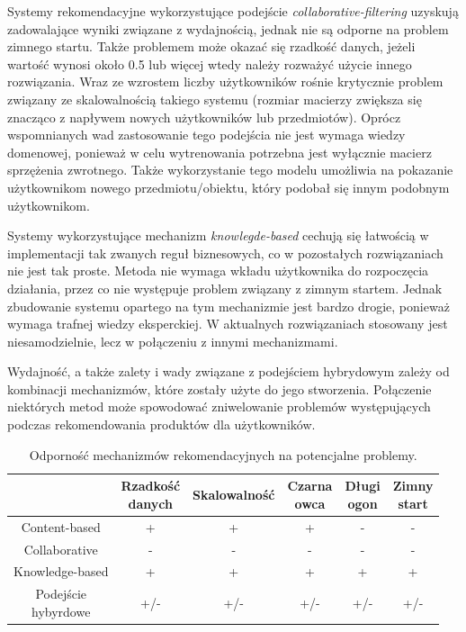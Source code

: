 Systemy rekomendacyjne wykorzystujące podejście \textit{collaborative-filtering} uzyskują zadowalające wyniki związane z wydajnością, jednak nie są odporne na problem zimnego startu. Także problemem może okazać się rzadkość danych, jeżeli wartość wynosi około 0.5 lub więcej wtedy należy rozważyć użycie innego rozwiązania. Wraz ze wzrostem liczby użytkowników rośnie krytycznie problem związany ze skalowalnością takiego systemu (rozmiar macierzy zwiększa się znacząco z napływem nowych użytkowników lub przedmiotów). Oprócz wspomnianych wad zastosowanie tego podejścia nie jest wymaga wiedzy domenowej, ponieważ w celu wytrenowania potrzebna jest wyłącznie macierz sprzężenia zwrotnego. Także wykorzystanie tego modelu umożliwia na pokazanie użytkownikom nowego przedmiotu/obiektu, który podobał się innym podobnym użytkownikom.

Systemy wykorzystujące mechanizm \textit{knowlegde-based} cechują się łatwością w implementacji tak zwanych reguł biznesowych, co w pozostałych rozwiązaniach nie jest tak proste. Metoda nie wymaga wkładu użytkownika do rozpoczęcia działania, przez co nie występuje problem związany z zimnym startem. Jednak zbudowanie systemu opartego na tym mechanizmie jest bardzo drogie, ponieważ wymaga trafnej wiedzy eksperckiej. W aktualnych rozwiązaniach stosowany jest niesamodzielnie, lecz w połączeniu z innymi mechanizmami.  \cite{reviewCurrentRS}

Wydajność, a także zalety i wady związane z podejściem hybrydowym zależy od kombinacji mechanizmów, które zostały użyte do jego stworzenia. Połączenie niektórych metod może spowodować zniwelowanie problemów występujących podczas rekomendowania produktów dla użytkowników.

\begin{table}[h]
\centering
\caption{Odporność mechanizmów rekomendacyjnych na potencjalne problemy.}
\begin{tabular}{|c|c|c|c|c|c|}
\hline
&
\specialcell{Rzadkość\\danych} &
Skalowalność &
\specialcell{Czarna\\owca} &
\specialcell{Długi\\ogon} &
\specialcell{Zimny\\start}
\\
\hline
  
Content-based &
+ &
+ &
+ &
- &
-
\\
\hline
  
Collaborative &
- &
- &
- &
- &
-
\\
\hline

Knowledge-based &
+ &
+ &
+ &
+ &
+
\\
\hline

\specialcell{Podejście\\hybyrdowe} &
+/- &
+/- &
+/- &
+/- &
+/-
\\
\hline
\end{tabular} 
\label{tabelaMetProblem}
\end{table}
